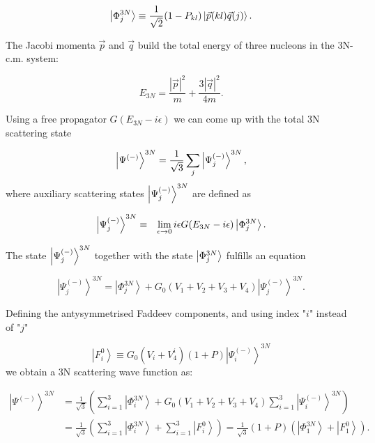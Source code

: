     \begin{equation}
        \ket{\Phi^{3N}_j} \equiv \frac{1}{\sqrt{2}}(1 - P_{kl})
        \ket{\vec{p}(kl)\vec{q}(j)}.\\
    \end{equation}

    The Jacobi momenta $\vec{p}$ and $\vec{q}$ build the total energy of three
    nucleons in the 3N-c.m. system:
    
    \begin{equation}
        E_{3N} = \frac{|\vec{p}|^2}{m} + \frac{3 |\vec{q}|^2}{4m}.
    \end{equation}
    
    Using a free propagator $G(E_{3N} - i\epsilon)$ we can come up with
    the total 3N scattering state

    \begin{equation}
        \ket{\Psi^{(-)}}^{3N} = \frac{1}{\sqrt{3}} \sum_j\ket{\Psi^{(-)}_j}^{3N},  
    \end{equation}
    where auxiliary scattering states $\ket{\Psi^{(-)}_j}^{3N}$ are defined as \cite{Glockle1983} 

    \begin{eqnarray}
        \ket{\Psi^{(-)}_j}^{3N}  &\equiv& \lim_{\epsilon \rightarrow 0}
        i \epsilon G(E_{3N} - i\epsilon)\ket{\Phi^{3N}_j}.
    \end{eqnarray}

    The state $\ket{\Psi^{(-)}_j}^{3N}$ together with the state $\ket{\Phi^{3N}_j}$ fulfills an equation \cite{Glockle1983}

    \begin{equation}
        \left|\Psi_j^{(-)}\right\rangle^{3 N}=\left|\Phi_j^{3 N}\right\rangle+
        G_0\left(V_1+V_2+V_3+V_4\right)\left|\Psi_j^{(-)}\right\rangle^{3 N}.
    \end{equation}

    Defining the antysymmetrised Faddeev components, and using index "$i$" instead of "$j$"

    \begin{equation}
        \left|F_i^0\right\rangle \equiv G_0\left(V_i+V_4^{i}\right)(1+P)\left|\Psi_i^{(-)}\right\rangle^{3 N}
        \label{faddeev_3n}
    \end{equation}
    we obtain a 3N scattering wave function as:

    \begin{equation}
        \begin{aligned}
            \left|\Psi^{(-)}\right\rangle^{3 N} & =\frac{1}{\sqrt{3}}\left(\sum_{i=1}^3\left|\Phi_i^{3 N}\right\rangle+G_0\left(V_1+V_2+V_3+V_4\right) \sum_{i=1}^3\left|\Psi_i^{(-)}\right\rangle^{3 N}\right) \\
            & =\frac{1}{\sqrt{3}}\left(\sum_{i=1}^3\left|\Phi_i^{3 N}\right\rangle+\sum_{i=1}^3\left|F_i^0\right\rangle\right)
            =\frac{1}{\sqrt{3}}(1+P)\left(\left|\Phi_1^{3 N}\right\rangle+\left|F_1^0\right\rangle\right) .
        \end{aligned}
        \label{3n_scat_psi}
    \end{equation}

